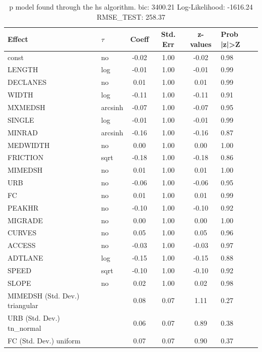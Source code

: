 \begin{table}
	\caption{p model found through the hs algorithm. bic: 3400.21 Log-Likelihood: -1616.24 RMSE_TEST: 258.37}
	\begin{center}
		\begin{tabular}{|l|l|c|c|c|l|}
			\hline
			Effect & $\tau$ & Coeff & Std. Err & z-values & Prob |z|>Z \\
			\hline
			const & no & -0.02 & 1.00 & -0.02 & 0.98 \\
			\hline
			LENGTH & log & -0.01 & 1.00 & -0.01 & 0.99 \\
			\hline
			DECLANES & no & 0.01 & 1.00 & 0.01 & 0.99 \\
			\hline
			WIDTH & log & -0.11 & 1.00 & -0.11 & 0.91 \\
			\hline
			MXMEDSH & arcsinh & -0.07 & 1.00 & -0.07 & 0.95 \\
			\hline
			SINGLE & log & -0.01 & 1.00 & -0.01 & 0.99 \\
			\hline
			MINRAD & arcsinh & -0.16 & 1.00 & -0.16 & 0.87 \\
			\hline
			MEDWIDTH & no & 0.00 & 1.00 & 0.00 & 1.00 \\
			\hline
			FRICTION & sqrt & -0.18 & 1.00 & -0.18 & 0.86 \\
			\hline
			MIMEDSH & no & 0.01 & 1.00 & 0.01 & 1.00 \\
			\hline
			URB & no & -0.06 & 1.00 & -0.06 & 0.95 \\
			\hline
			FC & no & 0.01 & 1.00 & 0.01 & 0.99 \\
			\hline
			PEAKHR & no & -0.10 & 1.00 & -0.10 & 0.92 \\
			\hline
			MIGRADE & no & 0.00 & 1.00 & 0.00 & 1.00 \\
			\hline
			CURVES & no & 0.05 & 1.00 & 0.05 & 0.96 \\
			\hline
			ACCESS & no & -0.03 & 1.00 & -0.03 & 0.97 \\
			\hline
			ADTLANE & log & -0.15 & 1.00 & -0.15 & 0.88 \\
			\hline
			SPEED & sqrt & -0.10 & 1.00 & -0.10 & 0.92 \\
			\hline
			SLOPE & no & 0.02 & 1.00 & 0.02 & 0.98 \\
			\hline
			MIMEDSH (Std. Dev.) triangular &  & 0.08 & 0.07 & 1.11 & 0.27 \\
			\hline
			URB (Std. Dev.) tn_normal &  & 0.06 & 0.07 & 0.89 & 0.38 \\
			\hline
			FC (Std. Dev.) uniform &  & 0.07 & 0.07 & 0.90 & 0.37 \\

\end{tabular}
\end{center}
\end{table}
